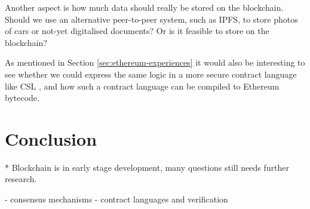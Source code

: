 \documentclass[oneside,a4paper,10pts,article]{memoir}
\begin{document}
Another aspect is how much data should really be stored on the
blockchain. Should we use an alternative peer-to-peer system, such as
IPFS, to store photos of cars or not-yet digitalised documents? Or is
it feasible to store on the blockchain?

As mentioned in Section \ref{sec:ethereum-experiences} it would also
be interesting to see whether we could express the same logic in a
more secure contract language like CSL \cite{hvitved2011contract}, and
how such a contract language can be compiled to Ethereum bytecode.

\chapter{Conclusion}
\label{sec:conclusion}

* Blockchain is in early stage development, many questions still needs
further research.

  - consensus mechanisms
  - contract languages and verification





\end{document}
